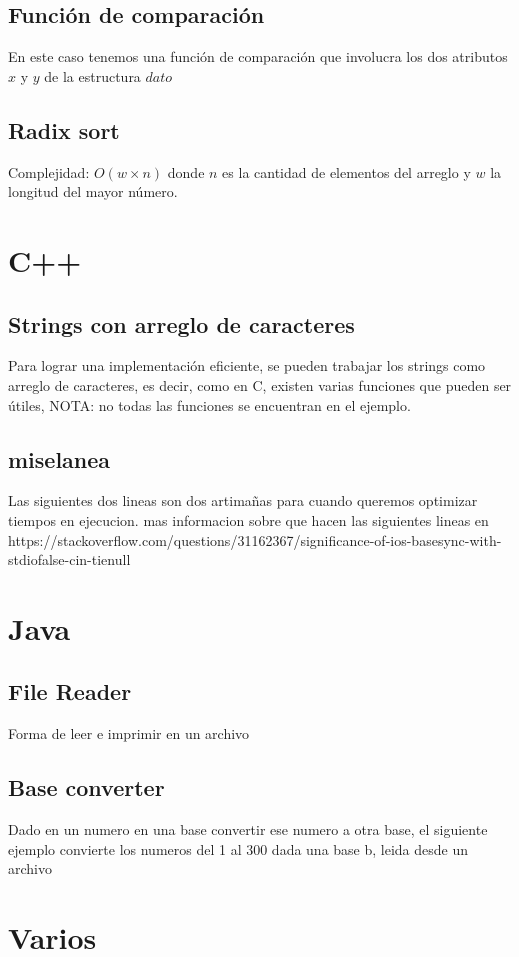\documentclass[10pt,letterpaper]{article}
\newcommand{\source}[1]{
  
  \dotfill
}
\begin{document}
  \subsection{Función de comparación}
  En este caso tenemos una función de comparación que involucra los dos atributos $x$ y $y$ de la estructura $dato$
  \source{./src/struct.cpp}
  \subsection{Radix sort}
  Complejidad: $O(w \times n)$ donde $n$ es la cantidad de elementos del arreglo y $w$ la longitud del mayor número.\\
  \source{./src/radixSort.cpp}

\section{C++}
  \subsection{Strings con arreglo de caracteres}
  Para lograr una implementación eficiente, se pueden trabajar los strings como arreglo de caracteres, es decir, como en C, existen varias funciones que pueden ser útiles, NOTA: no todas las funciones se encuentran en el ejemplo.
  \source{./src/getsScanfGetline.cpp}
  
  \subsection{miselanea}
  
  Las siguientes dos lineas son dos artimañas para cuando queremos optimizar tiempos en ejecucion. mas informacion sobre que hacen las siguientes lineas en https://stackoverflow.com/questions/31162367/significance-of-ios-basesync-with-stdiofalse-cin-tienull
    \source{./src/tricks.cpp}

\section{Java}

\subsection{File Reader}
Forma de leer e imprimir en un archivo 
\source{./src/fileIn.java}

 \subsection{Base converter}
 Dado en un numero en una base convertir ese numero a otra base, el siguiente ejemplo convierte los numeros del 1 al 300 dada una base b, leida desde un archivo
 \source{./src/palsquare.java}


\section{Varios}
\end{document}
